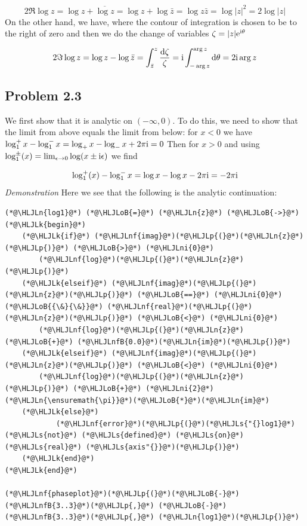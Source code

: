 \documentclass[12pt,a4paper]{article}
\newcommand{\HLJLk}[1]{\textcolor[RGB]{148,91,176}{\textbf{#1}}}
\newcommand{\HLJLn}[1]{#1}
\newcommand{\HLJLnf}[1]{\textcolor[RGB]{66,102,213}{#1}}
\newcommand{\HLJLs}[1]{\textcolor[RGB]{201,61,57}{#1}}
\newcommand{\HLJLnfB}[1]{\textcolor[RGB]{59,151,46}{#1}}
\newcommand{\HLJLni}[1]{\textcolor[RGB]{59,151,46}{#1}}
\newcommand{\HLJLoB}[1]{\textcolor[RGB]{102,102,102}{\textbf{#1}}}
\newcommand{\HLJLp}[1]{#1}
\def\D{ {\rm d} }
\def\I{ {\rm i} }
\def\E{ {\rm e} }
\begin{document}
\[
2 \Re \log z = \log z + \overline{\log z} = \log z + \log \bar z = \log z \bar z = \log |z|^2 = 2 \log |z|
\]
On the other hand, we have, where the contour of integration is chosen to be to the right of zero and then we do the change of variables $\zeta = |z| \E^{\I \theta}$

\[
2 \Im \log z = \log z - \log \bar z = \int_{\bar z}^z {\D \zeta \over \zeta} = \I \int_{-\arg z}^{\arg z} \D \theta = 2 \I \arg z
\]
\subsection{Problem 2.3}
We first show that it is analytic on $(-\infty,0)$. To do this, we need to show that the limit from above equals the limit from below: for $x < 0$ we have $\log_1^+ x -\log_1^- x = \log_+x - \log_- x +2 \pi \I = 0$ Then for $x > 0$ and using $\log_1^\pm(x) = \lim_{\epsilon\rightarrow 0} \log(x\pm \I \epsilon)$ we find

\[
\log_1^+(x) - \log_1^-x = \log x- \log x- 2\pi \I = -2 \pi \I
\]
\emph{Demonstration} Here we see that the following is the analytic continuation:


\begin{lstlisting}
(*@\HLJLn{log1}@*) (*@\HLJLoB{=}@*) (*@\HLJLn{z}@*) (*@\HLJLoB{->}@*) (*@\HLJLk{begin}@*)
    (*@\HLJLk{if}@*) (*@\HLJLnf{imag}@*)(*@\HLJLp{(}@*)(*@\HLJLn{z}@*)(*@\HLJLp{)}@*) (*@\HLJLoB{>}@*) (*@\HLJLni{0}@*) 
        (*@\HLJLnf{log}@*)(*@\HLJLp{(}@*)(*@\HLJLn{z}@*)(*@\HLJLp{)}@*)
    (*@\HLJLk{elseif}@*) (*@\HLJLnf{imag}@*)(*@\HLJLp{(}@*)(*@\HLJLn{z}@*)(*@\HLJLp{)}@*) (*@\HLJLoB{==}@*) (*@\HLJLni{0}@*) (*@\HLJLoB{{\&}{\&}}@*) (*@\HLJLnf{real}@*)(*@\HLJLp{(}@*)(*@\HLJLn{z}@*)(*@\HLJLp{)}@*) (*@\HLJLoB{<}@*) (*@\HLJLni{0}@*)
        (*@\HLJLnf{log}@*)(*@\HLJLp{(}@*)(*@\HLJLn{z}@*) (*@\HLJLoB{+}@*) (*@\HLJLnfB{0.0}@*)(*@\HLJLn{im}@*)(*@\HLJLp{)}@*)
    (*@\HLJLk{elseif}@*) (*@\HLJLnf{imag}@*)(*@\HLJLp{(}@*)(*@\HLJLn{z}@*)(*@\HLJLp{)}@*) (*@\HLJLoB{<}@*) (*@\HLJLni{0}@*)
        (*@\HLJLnf{log}@*)(*@\HLJLp{(}@*)(*@\HLJLn{z}@*)(*@\HLJLp{)}@*) (*@\HLJLoB{+}@*) (*@\HLJLni{2}@*)(*@\HLJLn{\ensuremath{\pi}}@*)(*@\HLJLoB{*}@*)(*@\HLJLn{im}@*)
    (*@\HLJLk{else}@*)
            (*@\HLJLnf{error}@*)(*@\HLJLp{(}@*)(*@\HLJLs{"{}log1}@*) (*@\HLJLs{not}@*) (*@\HLJLs{defined}@*) (*@\HLJLs{on}@*) (*@\HLJLs{real}@*) (*@\HLJLs{axis"{}}@*)(*@\HLJLp{)}@*)
    (*@\HLJLk{end}@*)
(*@\HLJLk{end}@*)

(*@\HLJLnf{phaseplot}@*)(*@\HLJLp{(}@*)(*@\HLJLoB{-}@*)(*@\HLJLnfB{3..3}@*)(*@\HLJLp{,}@*) (*@\HLJLoB{-}@*)(*@\HLJLnfB{3..3}@*)(*@\HLJLp{,}@*) (*@\HLJLn{log1}@*)(*@\HLJLp{)}@*)
\end{lstlisting}
\end{document}
